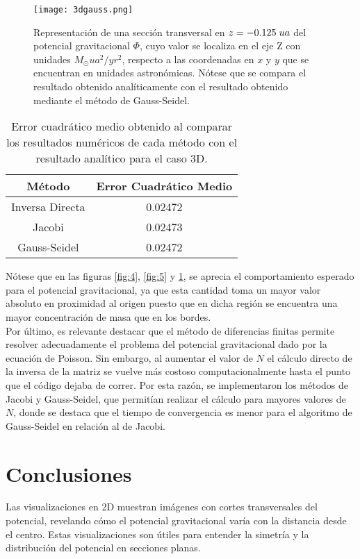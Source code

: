 \documentclass[reprint,amsmath,amssymb,aps]{revtex4-1}
\begin{document}
\begin{figure}
    \centering
    \texttt{[image: 3dgauss.png]}
    \caption{Representación de una sección transversal en $z=-0.125 \hspace{0.1 cm} ua$ del potencial gravitacional $\varPhi$, cuyo valor se localiza en el eje Z con unidades $M_{\odot} ua^2/yr^2$, respecto a las coordenadas en $x$ y $y$ que se encuentran en unidades astronómicas. Nótese que se compara el resultado obtenido analíticamente con el resultado obtenido mediante el método de Gauss-Seidel.}
    \label{fig:6}
\end{figure}
\begin{table}
    \centering
    \begin{tabular}{|c|c|} \hline
    \rowcolor[HTML]{EFEFEF}
         Método & Error Cuadrático Medio \\ \hline
         Inversa Directa &   0.02472 \\ \hline
         Jacobi & 0.02473\\ \hline
         Gauss-Seidel & 0.02472\\ \hline
    \end{tabular}
    \caption{Error cuadrático medio obtenido al comparar los resultados numéricos de cada método con el resultado analítico para el caso 3D.}
    \label{tab:2}
\end{table}

Nótese que en las figuras \ref{fig:4}, \ref{fig:5} y \ref{fig:6}, se aprecia el comportamiento esperado para el potencial gravitacional, ya que esta cantidad toma un mayor valor absoluto en proximidad al origen puesto que en dicha región se encuentra una mayor concentración de masa que en los bordes.\\

Por último, es relevante destacar que el método de diferencias finitas permite resolver adecuadamente el problema del potencial gravitacional dado por la ecuación de Poisson. Sin embargo, al aumentar el valor de $N$ el cálculo directo de la inversa de la matriz se vuelve más costoso computacionalmente hasta el punto que el código dejaba de correr. Por esta razón, se implementaron los métodos de Jacobi y Gauss-Seidel, que permitían realizar el cálculo para mayores valores de $N$, donde se destaca que el tiempo de convergencia es menor para el algoritmo de Gauss-Seidel en relación al de Jacobi.\\

 
\section{Conclusiones}
Las visualizaciones en 2D muestran imágenes con cortes transversales del potencial, revelando cómo el potencial gravitacional varía con la distancia desde el centro. Estas visualizaciones son útiles para entender la simetría y la distribución del potencial en secciones planas.
\end{document}
